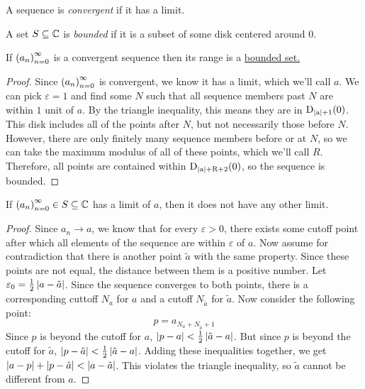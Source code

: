 \begin{definition}
A sequence is \emph{convergent} if it has a limit.
\end{definition}
\begin{definition}
A set $S \subseteq \C$ is \emph{bounded} if it is a subset of some disk centered around $0$.
\end{definition}
\begin{lemma}
If $\seq{a}$ is a convergent sequence then its range is a \hyperlink{Bounded Set}{bounded set.}
\end{lemma}
\begin{proof}
Since $\seq{a}$ is convergent, we know it has a limit, which we'll call $a$. We can pick $\varepsilon = 1$ and find some $N$ such that all sequence members past $N$ are within $1$ unit of $a$. By the triangle inequality, this means they are in $\disk{0}{\modulus{a}+1}$. This disk includes all of the points after $N$, but not necessarily those before $N$. However, there are only finitely many sequence members before or at $N$, so we can take the maximum modulus of all of these points, which we'll call $R$. Therefore, all points are contained within $\disk{0}{\modulus{a}+R+2}$, so the sequence is bounded.
\end{proof}
\begin{theorem}
If $\seq{a} \in S \subseteq \C$ has a limit of $a$, then it does not have any other limit.
\end{theorem}
\begin{proof}
Since $a_n \to a$, we know that for every $\varepsilon > 0$, there exists some cutoff point after which all elements of the sequence are within $\varepsilon$ of $a$. Now assume for contradiction that there is another point $\tilde{a}$ with the same property. Since these points are not equal, the distance between them is a positive number. Let $\varepsilon_0 = \frac{1}{2}\modulus{a-\tilde{a}}$. Since the sequence converges to both points, there is a corresponding cuttoff $N_{a}$ for $a$ and a cutoff $N_{\tilde{a}}$ for $\tilde{a}$. Now consider the following point:
\begin{equation*} p = a_{N_{a}+N_{\tilde{a}}+1} \end{equation*}
Since $p$ is beyond the cutoff for $a$, $\modulus{p-a}<\frac{1}{2}\modulus{\tilde{a}-a}$. But since $p$ is beyond the cutoff for $\tilde{a}$, $\modulus{p-\tilde{a}} < \frac{1}{2}\modulus{\tilde{a}-a}$. Adding these inequalities together, we get $\modulus{a-p}+\modulus{p-\tilde{a}} < \modulus{a-\tilde{a}}$. This violates the triangle inequality, so $\tilde{a}$ cannot be different from $a$.
\end{proof}
